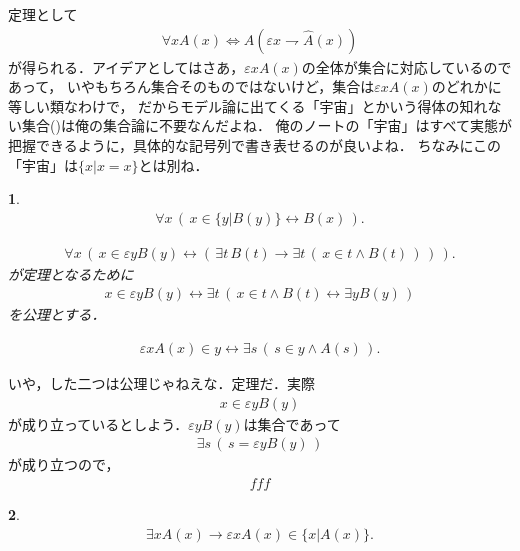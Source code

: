 \documentclass[a4j,10.5pt,oneside,openany]{jsbook}
\theoremstyle{mystyle}
\newtheorem{thm}{\color{DarkMidnightBlue}{定理}}[section]
\newtheorem{axm}[thm]{\color{Mahogany}{公理}}
\begin{document}
	定理として
	\begin{align}
		\forall x A(x) \Longleftrightarrow A(\varepsilon x \rightharpoondown \hat{A}(x))
	\end{align}
	が得られる．アイデアとしてはさあ，$\varepsilon x A(x)$の全体が集合に対応しているのであって，
	いやもちろん集合そのものではないけど，集合は$\varepsilon x A(x)$のどれかに等しい類なわけで，
	だからモデル論に出てくる「宇宙」とかいう得体の知れない集合()は俺の集合論に不要なんだよね．
	俺のノートの「宇宙」はすべて実態が把握できるように，具体的な記号列で書き表せるのが良いよね．
	ちなみにこの「宇宙」は$\{x|x=x\}$とは別ね．
	
	\begin{screen}
		\begin{axm}
			\begin{align}
				\forall x\, \left(\, x \in \{y|B(y)\} \leftrightarrow B(x)\, \right).
			\end{align}
			
			\begin{align}
				\forall x\, \left(\, x \in \varepsilon y B(y) \leftrightarrow
				\left(\, \exists t\, B(t) \rightarrow 
				\exists t\, \left(\, x \in t \wedge B(t)\, \right)\, \right)\, \right).
			\end{align}
			が定理となるために
			\begin{align}
				x \in \varepsilon y B(y) \leftrightarrow
				\exists t\, \left(\, x \in t \wedge B(t) \leftrightarrow \exists y B(y)\, \right)
			\end{align}
			を公理とする．
			
			\begin{align}
				\varepsilon x A(x) \in y \leftrightarrow
				\exists s\, \left(\, s \in y \wedge A(s)\, \right).
			\end{align}
		\end{axm}
	\end{screen}
	
	いや，した二つは公理じゃねえな．定理だ．実際
	\begin{align}
		x \in \varepsilon y B(y)
	\end{align}
	が成り立っているとしよう．$\varepsilon y B(y)$は集合であって
	\begin{align}
		\exists s\, \left(\, s = \varepsilon y B(y)\, \right)
	\end{align}
	が成り立つので，
	\begin{align}
		fff
	\end{align}
	
	\begin{screen}
		\begin{thm}
			\begin{align}
				\exists x A(x) \rightarrow \varepsilon x A(x) \in \{x|A(x)\}.
			\end{align}
		\end{thm}
	\end{screen}
	
\end{document}
